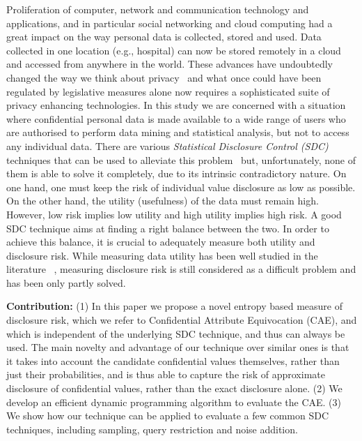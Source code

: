 \documentclass{llncs}
\begin{document}
Proliferation of computer, network and communication technology and applications,
and in particular social networking and cloud computing had
a great impact on the way personal data is collected, stored and used. Data collected in one location (e.g., hospital) can now be stored
 remotely in a cloud and accessed from anywhere in the world.
These advances have undoubtedly changed the way we think about privacy~\cite{KingBrankovicGillard2012,Brankovic:Estivill-Castro:99,est-ca:bra:do} and
what once could have been regulated by legislative measures alone now requires
 a sophisticated suite of privacy enhancing technologies.
In this study we are concerned with a situation where confidential personal data is made
available  to a wide range of users who are authorised to perform data mining and statistical analysis, but not to access any
individual data.
There are
various \emph{Statistical Disclosure Control (SDC)} techniques that can be used to alleviate this
problem~\cite{Netherlands-Willenborg:ElementsSDC01,Nabil:ComparativeStudy89,Brankovic-Giggins:Ch12,Brankovic-Zahid:Ch11,FungWangChenYu2010} but, unfortunately, none
of them is able to solve it completely, due to  its
intrinsic contradictory nature. On one hand, one must keep the
risk of individual value disclosure as low as possible. On the
other hand, the utility (usefulness) of the data must remain
high. However, low risk implies low utility and high utility
implies high risk. A good SDC technique aims at finding a right
balance between the two. In order to achieve this balance, it is
crucial to adequately measure both utility and disclosure risk.
While measuring data utility has been well studied in the
literature ~\cite{bra:hor:mil:wri,bra:mil:sir02,bra,bra:sir,bra:mil:sir00,isl:bar:bra,Netherlands-Willenborg:ElementsSDC01}, measuring
disclosure risk is still considered as a difficult problem and has
been only partly solved.

\textbf{Contribution:} (1) In this paper we  propose a novel entropy
based measure of disclosure risk, which we refer to Confidential Attribute
Equivocation (CAE), and which is independent of the underlying SDC technique,
and thus can always be used. The main novelty and advantage of our technique over similar
ones is that it takes into account the candidate confidential values themselves,
rather than just their probabilities,  and is thus able to capture the risk of
approximate disclosure of confidential values, rather than the exact disclosure alone.
(2) We develop an efficient dynamic programming algorithm to evaluate  the CAE.
(3) We show how our technique can be applied to evaluate a few common SDC techniques,
including sampling, query restriction and noise addition.
\end{document}

